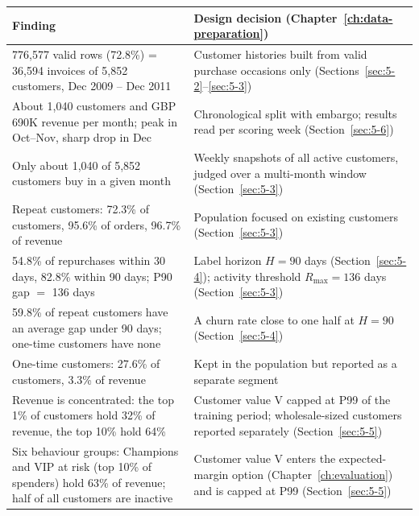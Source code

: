 \begin{center}
\begin{tabular}{@{}p{7.2cm}p{7cm}@{}}
    \toprule
    Finding & Design decision (Chapter~\ref{ch:data-preparation}) \\
    \midrule
    776,577 valid rows (72.8\%) = 36,594 invoices of 5,852 customers, Dec 2009 -- Dec 2011 & Customer histories built from valid purchase occasions only (Sections~\ref{sec:5-2}--\ref{sec:5-3}) \\
    About 1,040 customers and GBP 690K revenue per month; peak in Oct--Nov, sharp drop in Dec & Chronological split with embargo; results read per scoring week (Section~\ref{sec:5-6}) \\
    Only about 1,040 of 5,852 customers buy in a given month & Weekly snapshots of all active customers, judged over a multi-month window (Section~\ref{sec:5-3}) \\
    Repeat customers: 72.3\% of customers, 95.6\% of orders, 96.7\% of revenue & Population focused on existing customers (Section~\ref{sec:5-3}) \\
    54.8\% of repurchases within 30 days, 82.8\% within 90 days; P90 gap $=$ 136 days & Label horizon $H = 90$ days (Section~\ref{sec:5-4}); activity threshold $R_{\max} = 136$ days (Section~\ref{sec:5-3}) \\
    59.8\% of repeat customers have an average gap under 90 days; one-time customers have none & A churn rate close to one half at $H = 90$ (Section~\ref{sec:5-4}) \\
    One-time customers: 27.6\% of customers, 3.3\% of revenue & Kept in the population but reported as a separate segment \\
    Revenue is concentrated: the top 1\% of customers hold 32\% of revenue, the top 10\% hold 64\% & Customer value V capped at P99 of the training period; wholesale-sized customers reported separately (Section~\ref{sec:5-5}) \\
    Six behaviour groups: Champions and VIP at risk (top 10\% of spenders) hold 63\% of revenue; half of all customers are inactive & Customer value V enters the expected-margin option (Chapter~\ref{ch:evaluation}) and is capped at P99 (Section~\ref{sec:5-5}) \\
    \bottomrule
\end{tabular}
\end{center}
